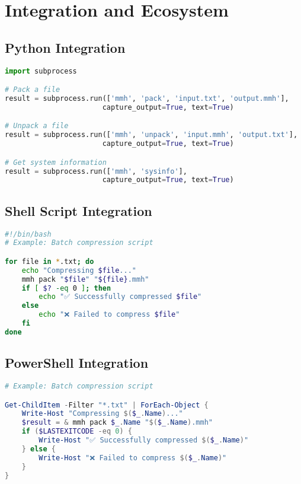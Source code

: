 \documentclass[12pt,a4paper]{article}
\begin{document}
\newpage

\section{Integration and Ecosystem}

\subsection{Python Integration}
\begin{lstlisting}[language=Python, caption=Python Integration Example]
import subprocess

# Pack a file
result = subprocess.run(['mmh', 'pack', 'input.txt', 'output.mmh'], 
                       capture_output=True, text=True)

# Unpack a file
result = subprocess.run(['mmh', 'unpack', 'input.mmh', 'output.txt'], 
                       capture_output=True, text=True)

# Get system information
result = subprocess.run(['mmh', 'sysinfo'], 
                       capture_output=True, text=True)
\end{lstlisting}

\subsection{Shell Script Integration}
\begin{lstlisting}[language=bash, caption=Batch Compression Script]
#!/bin/bash
# Example: Batch compression script

for file in *.txt; do
    echo "Compressing $file..."
    mmh pack "$file" "${file}.mmh"
    if [ $? -eq 0 ]; then
        echo "✅ Successfully compressed $file"
    else
        echo "❌ Failed to compress $file"
    fi
done
\end{lstlisting}

\subsection{PowerShell Integration}
\begin{lstlisting}[language=PowerShell, caption=PowerShell Batch Script]
# Example: Batch compression script

Get-ChildItem -Filter "*.txt" | ForEach-Object {
    Write-Host "Compressing $($_.Name)..."
    $result = & mmh pack $_.Name "$($_.Name).mmh"
    if ($LASTEXITCODE -eq 0) {
        Write-Host "✅ Successfully compressed $($_.Name)"
    } else {
        Write-Host "❌ Failed to compress $($_.Name)"
    }
}
\end{lstlisting}
\end{document}
